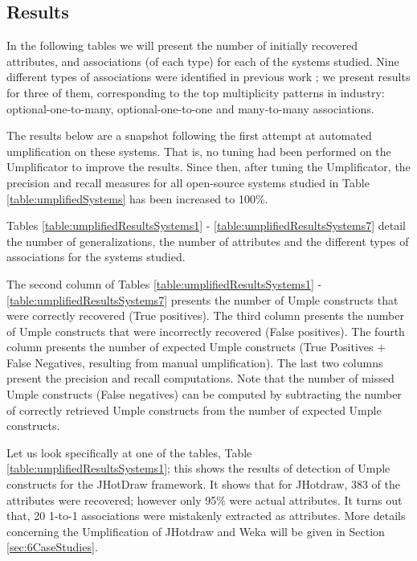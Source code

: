 \subsection{Results}

In the following tables we will present the number of initially recovered  attributes, and associations (of each type) for each of the systems studied. Nine different types of associations were identified in previous work \cite{UmpleAssociations}; we present results for three of them, corresponding to the top multiplicity patterns in industry: optional-one-to-many, optional-one-to-one and many-to-many associations.

The results below are a snapshot following the first attempt at automated umplification on these systems. That is, no tuning had been performed on the Umplificator to improve the results. Since then, after tuning the Umplificator,  the precision and recall measures for all open-source systems studied in Table \ref{table:umplifiedSystems} has been increased to 100\%.

Tables \ref{table:umplifiedResultsSystems1} - \ref{table:umplifiedResultsSystems7} detail the number of generalizations, the number of attributes and the different types of associations for the systems studied.

The second column of Tables \ref{table:umplifiedResultsSystems1} - \ref{table:umplifiedResultsSystems7} presents the number of Umple constructs that were correctly recovered (True positives). The third column presents the number of Umple constructs that were incorrectly recovered (False positives). The fourth column presents the number of expected Umple constructs (True Positives + False Negatives, resulting from manual umplification). The last two columns present the precision and recall computations. Note that the number of missed Umple constructs (False negatives) can be computed by subtracting the number of correctly retrieved Umple constructs from the number of expected Umple constructs. 


Let us look specifically at one of the tables, Table \ref{table:umplifiedResultsSystems1}; this shows the results of detection of Umple constructs for the JHotDraw framework.  It shows that for JHotdraw, 383 of the attributes were recovered; however only 95\% were actual attributes. It turns out that, 20 1-to-1 associations were mistakenly extracted as attributes. More details concerning the Umplification of JHotdraw and Weka will be given in Section \ref{sec:6CaseStudies}.

